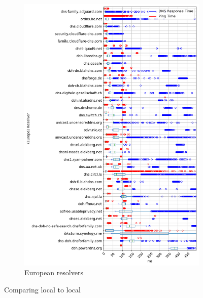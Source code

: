 \begin{figure}[t!]
\begin{subfigure}[t]{0.5\textwidth}
        \includegraphics[width=\linewidth]{figures/Frankfurt_Europe.png}
        \caption{European resolvers}
    \end{subfigure}

    \caption{Comparing local to local}
\end{figure}

